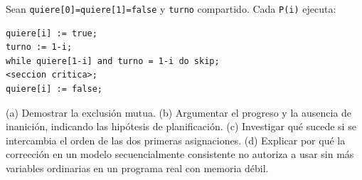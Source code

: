 \begin{ejercicio}
Sean \texttt{quiere[0]=quiere[1]=false} y \texttt{turno} compartido. Cada \texttt{P(i)} ejecuta:
\begin{lstlisting}
quiere[i] := true;
turno := 1-i;
while quiere[1-i] and turno = 1-i do skip;
<seccion critica>;
quiere[i] := false;
\end{lstlisting}
(a) Demostrar la exclusión mutua. (b) Argumentar el progreso y la ausencia de inanición, indicando las hipótesis
de planificación. (c) Investigar qué sucede si se intercambia el orden de las dos primeras asignaciones. (d)
Explicar por qué la corrección en un modelo secuencialmente consistente no autoriza a usar sin más variables
ordinarias en un programa real con memoria débil.
\end{ejercicio}
